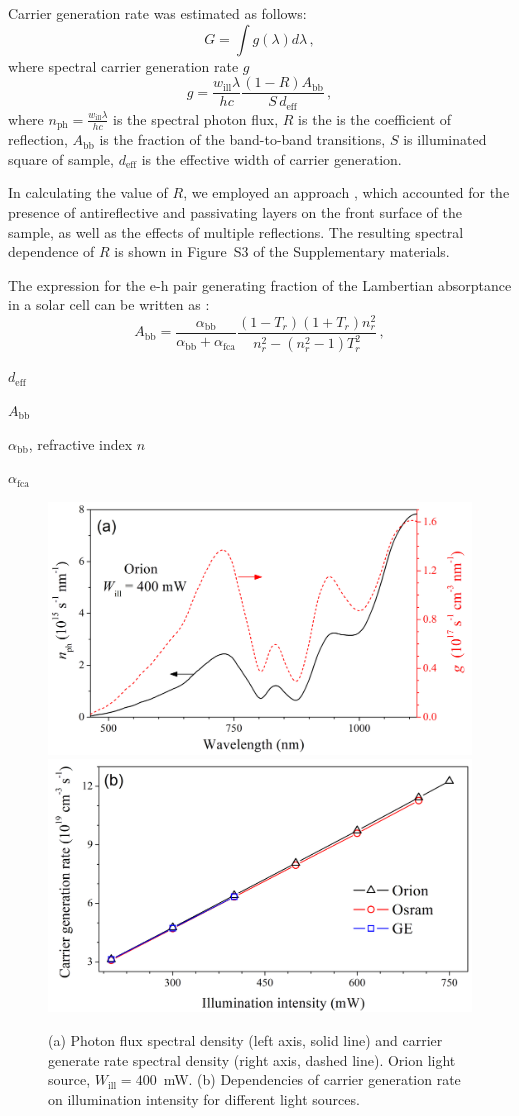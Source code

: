 \documentclass{WileyMSP-template}
\begin{document}
Carrier generation rate was estimated as follows:
\begin{equation}
\label{eqGint}
G=\int g(\lambda) d\lambda\,,
\end{equation}
where spectral carrier generation rate $g$
\begin{equation}
\label{eqGint}
g=\frac{w_\mathrm{ill}\lambda}{hc}\frac{(1-R)A_\mathrm{bb}}{S\,d_\mathrm{eff}}\,,
\end{equation}
where $n_\mathrm{ph}=\frac{w_\mathrm{ill}\lambda}{hc}$ is the spectral photon flux,
$R$ is the is the coefficient of reflection,
$A_\mathrm{bb}$ is the fraction of the band-to-band transitions,
$S$ is illuminated square of sample,
$d_\mathrm{eff}$ is the effective width of carrier generation.
 
In calculating the value of $R$, we employed an approach \cite{KostRefl2000}, 
which accounted for the presence of antireflective and passivating layers on the front surface of the sample, 
as well as the effects of multiple reflections. 
The resulting spectral dependence of $R$ is shown in Figure~S3 of the Supplementary materials. 
 
The expression for the e-h pair generating fraction of the Lambertian absorptance in a solar cell 
can be written as \cite{Schaefer2018}: 
\begin{equation}
\label{eqAbb}
A_\mathrm{bb}=\frac{\alpha_\mathrm{bb}}{\alpha_\mathrm{bb}+\alpha_\mathrm{fca}}\frac{(1-T_r)(1+T_r)n_r^2}{n_r^2-(n_r^2-1)T_r^2}\,,
\end{equation}

 

$d_\mathrm{eff}$ \cite{Bowden2007}

$A_\mathrm{bb}$ \cite{Schaefer2018}

$\alpha_\mathrm{bb}$, refractive index $n$ \cite{Green2022}

$\alpha_\mathrm{fca}$ \cite{SiFCA}


\begin{figure}
\centering
  \includegraphics[width=0.4\linewidth]{Fig5a.png}
  \includegraphics[width=0.4\linewidth]{Fig5b.png}
  \caption{
  (a) Photon flux spectral density (left axis, solid line) and carrier generate rate spectral density (right axis, dashed line).
  Orion light source, $W_\mathrm{ill}=400$~mW.
  (b) Dependencies of carrier generation rate on illumination intensity for different light sources.
  }
  \label{fig5}
\end{figure}
\end{document}
